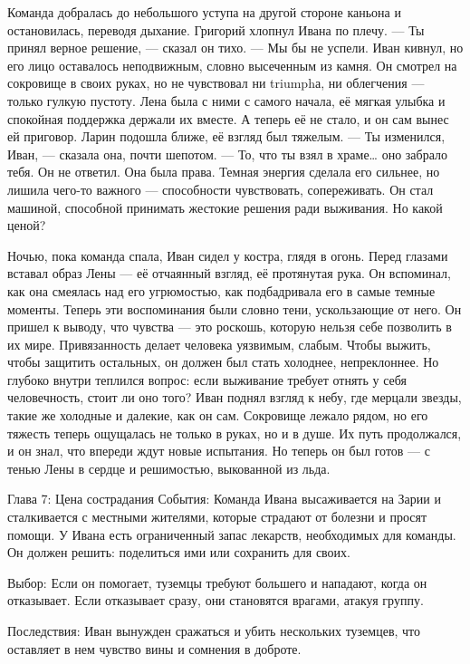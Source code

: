 \documentclass[12pt,a4paper]{book}
\begin{document}
Команда добралась до небольшого уступа на другой стороне каньона и остановилась, переводя дыхание. Григорий хлопнул Ивана по плечу.
— Ты принял верное решение, — сказал он тихо. — Мы бы не успели.
Иван кивнул, но его лицо оставалось неподвижным, словно высеченным из камня. Он смотрел на сокровище в своих руках, но не чувствовал ни triumphа, ни облегчения — только гулкую пустоту. Лена была с ними с самого начала, её мягкая улыбка и спокойная поддержка держали их вместе. А теперь её не стало, и он сам вынес ей приговор.
Ларин подошла ближе, её взгляд был тяжелым.
— Ты изменился, Иван, — сказала она, почти шепотом. — То, что ты взял в храме… оно забрало тебя.
Он не ответил. Она была права. Темная энергия сделала его сильнее, но лишила чего-то важного — способности чувствовать, сопереживать. Он стал машиной, способной принимать жестокие решения ради выживания. Но какой ценой?

Ночью, пока команда спала, Иван сидел у костра, глядя в огонь. Перед глазами вставал образ Лены — её отчаянный взгляд, её протянутая рука. Он вспоминал, как она смеялась над его угрюмостью, как подбадривала его в самые темные моменты. Теперь эти воспоминания были словно тени, ускользающие от него.
Он пришел к выводу, что чувства — это роскошь, которую нельзя себе позволить в их мире. Привязанность делает человека уязвимым, слабым. Чтобы выжить, чтобы защитить остальных, он должен был стать холоднее, непреклоннее. Но глубоко внутри теплился вопрос: если выживание требует отнять у себя человечность, стоит ли оно того?
Иван поднял взгляд к небу, где мерцали звезды, такие же холодные и далекие, как он сам. Сокровище лежало рядом, но его тяжесть теперь ощущалась не только в руках, но и в душе. Их путь продолжался, и он знал, что впереди ждут новые испытания. Но теперь он был готов — с тенью Лены в сердце и решимостью, выкованной из льда.




Глава 7: Цена сострадания
События: Команда Ивана высаживается на Зарии и сталкивается с местными жителями, которые страдают от болезни и просят помощи. У Ивана есть ограниченный запас лекарств, необходимых для команды. Он должен решить: поделиться ими или сохранить для своих.

Выбор: Если он помогает, туземцы требуют большего и нападают, когда он отказывает. Если отказывает сразу, они становятся врагами, атакуя группу.

Последствия: Иван вынужден сражаться и убить нескольких туземцев, что оставляет в нем чувство вины и сомнения в доброте.
\end{document}
